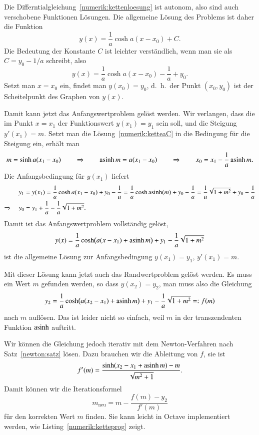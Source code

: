 \begin{loesung}
Die Differntialgleichung~\eqref{numerik:kettenloesung}
ist autonom, also sind auch verschobene Funktionen Lösungen.
Die allgemeine Lösung des Problems ist daher die Funktion
\begin{equation}
y(x)=\frac1a\cosh a(x-x_0) + C.
\label{numerik:ketteaC}
\end{equation}
Die Bedeutung der Konstante $C$ ist leichter verständlich, wenn man sie
als $C=y_0-1/a$ schreibt, also
\[
y(x)=\frac1a\cosh a(x-x_0) -\frac1a+y_0.
\]
Setzt man $x=x_0$ ein, findet man $y(x_0)=y_0$, d.~h.~der Punkt $(x_0,y_0)$
ist der Scheitelpunkt des Graphen von $y(x)$.

Damit kann jetzt das Anfangswertproblem gelöst werden.
Wir verlangen, dass die im Punkt $x=x_1$ der Funktionswert 
$y(x_1)=y_1$ sein soll, und die Steigung $y'(x_1)=m$.
Setzt man die Lösung~\eqref{numerik:ketteaC} in die Bedingung
für die Steigung ein, erhält man
\[
m=\sinh a(x_1-x_0)
\qquad\Rightarrow\qquad
\operatorname{asinh} m =a(x_1-x_0)
\qquad\Rightarrow\qquad
x_0=x_1-\frac1a\operatorname{asinh} m.
\]
Die Anfangsbedingung für $y(x_1)$ liefert
\begin{align*}
y_1
&=
y(x_1)
=
\frac1a\cosh a(x_1-x_0) + y_0 - \frac1a
=
\frac1a\cosh \operatorname{asinh}(m)+y_0-\frac1a
=
\frac1a\sqrt{1+m^2}+y_0-\frac1a
\\
\Rightarrow\quad
y_0
&= 
y_1+\frac1a-\frac1a\sqrt{1+m^2}.
\end{align*}
Damit ist das Anfangswertproblem vollständig gelöst, 
\begin{equation}
y(x)
=
\frac1a\cosh \bigl(a(x-x_1) + \operatorname{asinh} m\bigr)
+ y_1 - \frac1a\sqrt{1+m^2}
\end{equation}
ist die allgemeine Lösung zur Anfangsbedingung $y(x_1)=y_1$, $y'(x_1)=m$.

Mit dieser Lösung kann jetzt auch das Randwertproblem gelöst werden.
Es muss ein Wert $m$ gefunden werden, so dass $y(x_2)=y_2$,
man muss also die Gleichung
\[
y_2
=
\frac1a\cosh \bigl(a(x_2-x_1)+\operatorname{asinh} m\bigr) + y_1 - \frac1a\sqrt{1+m^2}
=:
f(m)
\]
nach $m$ auflösen.
Das ist leider nicht so einfach, weil $m$ in der transzendenten Funktion
$\operatorname{asinh}$ auftritt.

Wir können die Gleichung jedoch iterativ mit dem Newton-Verfahren
nach Satz~\ref{newton:satz} lösen.
Dazu brauchen wir die Ableitung von $f$, sie ist
\[
f'(m)
=
\frac{ \sinh (x_2-x_1+\operatorname{asinh} m) -m}{\sqrt{m^2+1}}.
\]
Damit können wir die Iterationsformel
\[
m_{\text{neu}} = m - \frac{f(m) - y_2}{f'(m)}
\]
für den korrekten Wert $m$ finden.
Sie kann leicht in Octave implementiert werden, wie Listing~\ref{numerik:ketteprog} zeigt.
%
%


\end{loesung}
